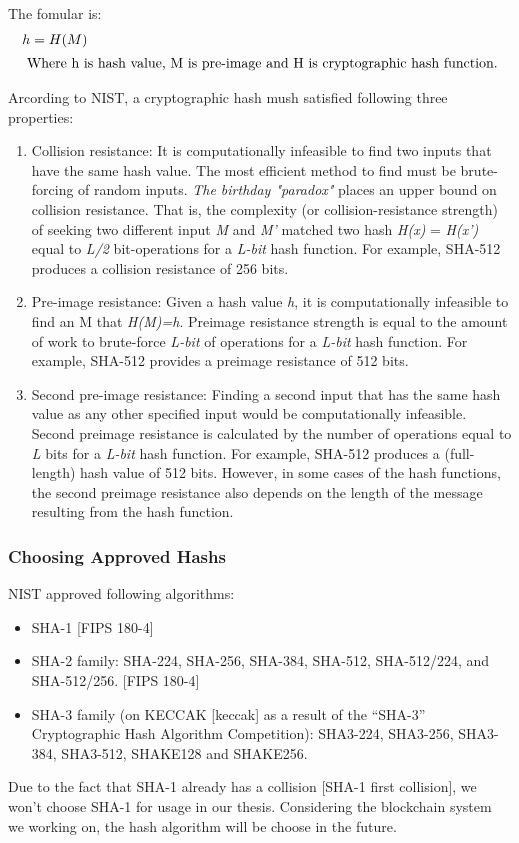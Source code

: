 The fomular is:
\begin{align*}
  h & = H(M) \\ \intertext{ Where h is hash value, M is pre-image and H is cryptographic hash function.}
\end{align*}


Arcording to NIST, a cryptographic hash mush satisfied following three properties:
\begin{enumerate}
  \item Collision resistance: It is computationally infeasible to find two inputs that have the same hash value.
        The most efficient method to find must be brute-forcing of random inputs.
        \emph{The birthday "paradox"} places an upper bound on collision resistance.
        That is, the complexity (or collision-resistance strength) of seeking two different input \emph{M} and \emph{M'} matched two hash \emph{H(x)} = \emph{H(x’)} equal to \emph{L/2} bit-operations for a \emph{L-bit} hash function.
        For example, SHA-512 produces a collision resistance of 256 bits.

  \item Pre-image resistance: Given a hash value \emph{h}, it is computationally infeasible to find an M that \emph{H(M)=h}.
        Preimage resistance strength is equal to the amount of work to brute-force \emph{L-bit} of operations for a \emph{L-bit} hash function.
        For example, SHA-512 provides a preimage resistance of 512 bits.

  \item Second pre-image resistance: Finding a second input that has the same hash value as any other specified input would be computationally infeasible.
        Second preimage resistance is calculated by the number of operations equal to  \emph{L} bits for a \emph{L-bit} hash function.
        For example, SHA-512 produces a (full-length) hash value of 512 bits.
        However, in some cases of the hash functions, the second preimage resistance also depends on the length of the message resulting from the hash function.

\end{enumerate}

\subsubsection{Choosing Approved Hashs}
NIST approved following algorithms:
\begin{itemize}
  \item SHA-1 [FIPS 180-4]

  \item SHA-2 family: SHA-224, SHA-256, SHA-384, SHA-512, SHA-512/224, and SHA-512/256. [FIPS 180-4]

  \item SHA-3 family (on KECCAK [keccak] as a result of the “SHA-3” Cryptographic Hash Algorithm Competition):  SHA3-224, SHA3-256, SHA3-384, SHA3-512, SHAKE128 and SHAKE256.
\end{itemize}
Due to the fact that SHA-1 already has a collision [SHA-1 first collision], we won't choose SHA-1 for usage in our thesis.
Considering the blockchain system we working on, the hash algorithm will be choose in the future.

